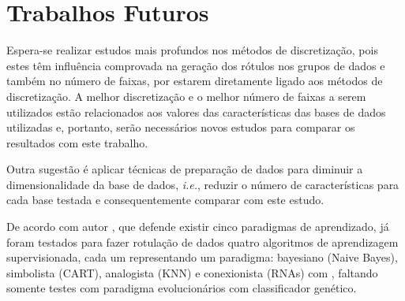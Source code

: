 



\section{Trabalhos Futuros}\label{cap:fut}



Espera-se realizar estudos mais profundos nos métodos de discretização, pois estes têm influência comprovada na geração dos rótulos nos grupos de dados e também no número de faixas, por estarem diretamente ligado aos métodos de discretização. A melhor discretização e o melhor número de faixas a serem utilizados estão relacionados aos valores das características das bases de dados utilizadas e, portanto, serão necessários novos estudos para comparar os resultados com este trabalho. 

Outra sugestão é aplicar técnicas de preparação de dados para diminuir a dimensionalidade da base de dados, \textit{i.e.}, reduzir o número de características para cada base testada e consequentemente comparar com este estudo.  

De acordo com autor , que defende existir cinco paradigmas de aprendizado, já foram testados para fazer rotulação de dados quatro algoritmos de aprendizagem supervisionada, cada um representando um paradigma: bayesiano (Naive Bayes), simbolista (CART), analogista (KNN) e conexionista (RNAs) com , faltando somente testes com paradigma evolucionários com classificador genético.







